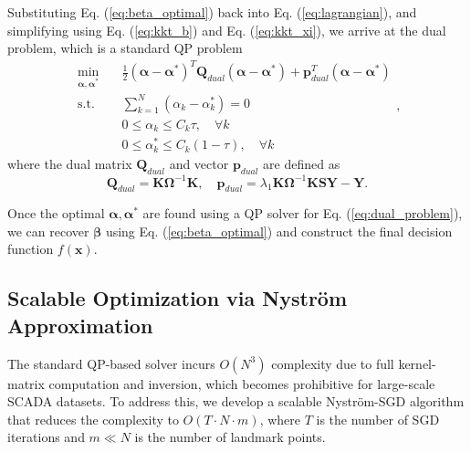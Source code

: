 \documentclass[a4paper]{cas-sc}
\begin{document}
Substituting Eq. (\ref{eq:beta_optimal}) back into Eq. (\ref{eq:lagrangian}), and simplifying using Eq. (\ref{eq:kkt_b}) and Eq. (\ref{eq:kkt_xi}), we arrive at the dual problem, which is a standard QP problem
\begin{equation}
\label{eq:dual_problem}
\begin{aligned}
\min_{\boldsymbol{\alpha}, \boldsymbol{\alpha}^*} \quad & \frac{1}{2} (\boldsymbol{\alpha} - \boldsymbol{\alpha}^*)^T \mathbf{Q}_{dual} (\boldsymbol{\alpha} - \boldsymbol{\alpha}^*) + \mathbf{p}_{dual}^T (\boldsymbol{\alpha} - \boldsymbol{\alpha}^*) \\
\text{s.t.} \quad & \sum_{k=1}^N (\alpha_k - \alpha_k^*) = 0 \\
& 0 \le \alpha_k \le C_k \tau, \quad \forall k \\
& 0 \le \alpha_k^* \le C_k (1-\tau), \quad \forall k
\end{aligned},
\end{equation}
where the dual matrix $\mathbf{Q}_{dual}$ and vector $\mathbf{p}_{dual}$ are defined as
\begin{equation}
\label{eq:dual_matrices}
\mathbf{Q}_{dual} = \boldsymbol{K} \boldsymbol{\Omega}^{-1} \boldsymbol{K}, \quad \mathbf{p}_{dual} = \lambda_1 \boldsymbol{K} \boldsymbol{\Omega}^{-1} \boldsymbol{K} \mathbf{S} \boldsymbol{Y} - \boldsymbol{Y}.
\end{equation}

Once the optimal $\boldsymbol{\alpha}, \boldsymbol{\alpha}^*$ are found using a QP solver for Eq. (\ref{eq:dual_problem}), we can recover $\boldsymbol{\beta}$ using Eq. (\ref{eq:beta_optimal}) and construct the final decision function $f(\boldsymbol{x})$.


\subsection{Scalable Optimization via Nystr\"{o}m Approximation}\label{fast_alg}
The standard QP-based solver incurs $O(N^3)$ complexity due to full kernel-matrix computation and inversion, which becomes prohibitive for large-scale SCADA datasets. To address this, we develop a scalable Nystr\"{o}m-SGD algorithm that reduces the complexity to $O(T \cdot N \cdot m)$, where $T$ is the number of SGD iterations and $m \ll N$ is the number of landmark points.
\end{document}
